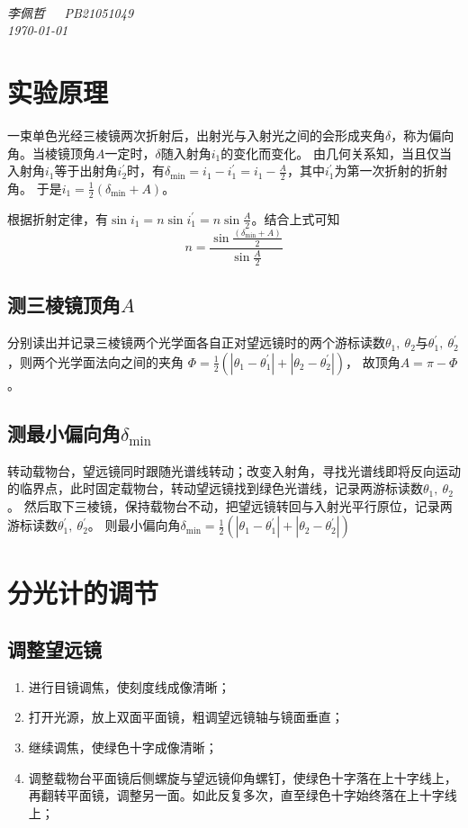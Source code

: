 \documentclass[a4paper]{article}%
\title{\heiti{实验报告}}%
\author{{\emph{李佩哲}}}
\date{\emph{\small\today}}
\begin{document}
\begin{center}
\\
\emph{李佩哲~~~PB21051049~~~\\\today}
\end{center}
\section{实验原理}
一束单色光经三棱镜两次折射后，出射光与入射光之间的会形成夹角$\delta$，称为偏向角。当棱镜顶角$A$一定时，$\delta$随入射角$i_1$的变化而变化。
由几何关系知，当且仅当入射角$i_1$等于出射角$i_2^\prime$时，有$\delta_{\min}=i_1-i_1^\prime=i_1-\frac{A}{2}$，其中$i_1^\prime$为第一次折射的折射角。
于是$i_1=\frac{1}{2}\left(\delta_{\min}+A\right)$。

根据折射定律，有$\sin i_1=n\sin i_1^\prime=n\sin \frac{A}{2}$。结合上式可知$$n=\frac{\sin \frac{\left(\delta_{\min}+A\right)}{2}}{\sin\frac{A}{2}}$$
\subsection{测三棱镜顶角$A$}
分别读出并记录三棱镜两个光学面各自正对望远镜时的两个游标读数$\theta_1,~\theta_2$与$\theta_1^\prime,~\theta_2^\prime$，则两个光学面法向之间的夹角
$\Phi =\frac{1}{2}\left(\left|\theta_1-\theta_1^\prime\right|+\left|\theta_2-\theta_2^\prime\right|\right)$，
故顶角$A=\pi-\Phi$。

\subsection{测最小偏向角$\delta_{\min}$}
转动载物台，望远镜同时跟随光谱线转动；改变入射角，寻找光谱线即将反向运动的临界点，此时固定载物台，转动望远镜找到绿色光谱线，记录两游标读数$\theta_1,~\theta_2$。
然后取下三棱镜，保持载物台不动，把望远镜转回与入射光平行原位，记录两游标读数$\theta_1^\prime,~\theta_2^\prime$。
则最小偏向角$\delta_{\min} =\frac{1}{2}\left(\left|\theta_1-\theta_1^\prime\right|+\left|\theta_2-\theta_2^\prime\right|\right)$

\section{分光计的调节}
\subsection{调整望远镜}
\begin{enumerate}
    \item 进行目镜调焦，使刻度线成像清晰；
    \item 打开光源，放上双面平面镜，粗调望远镜轴与镜面垂直；
    \item 继续调焦，使绿色十字成像清晰；
    \item 调整载物台平面镜后侧螺旋与望远镜仰角螺钉，使绿色十字落在上十字线上，再翻转平面镜，调整另一面。如此反复多次，直至绿色十字始终落在上十字线上；
\end{enumerate}
\end{document}
